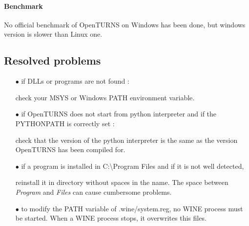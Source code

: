 \paragraph{Benchmark}

No official benchmark of OpenTURNS on Windows has been done, but windows version is slower than Linux one.

\subsection{Resolved problems}

\begin{itemize}
\item[$\bullet$]   if DLLs or programs are not found :

check your MSYS or Windows PATH environment variable.
\item[$\bullet$]   if OpenTURNS does not start from python interpreter and if the PYTHONPATH is correctly set :

check that the version of the python interpreter is the same as the version OpenTURNS has been compiled for.
\item[$\bullet$]   if a program is installed in C:\textbackslash Program Files and if it is not well detected,

reinstall it in directory without spaces in the name. The space between \emph{Program} and \emph{Files} can cause cumbersome problems.

\item[$\bullet$]   to modify the PATH variable of .wine/system.reg, no WINE process must be started. When a WINE process stops, it overwrites this files.

\end{itemize}
